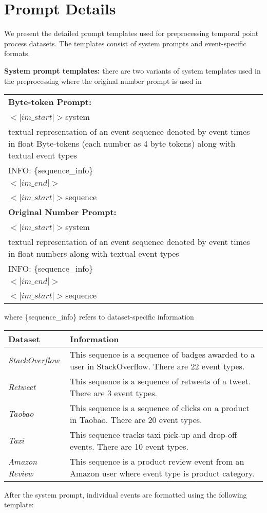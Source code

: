 

\section{Prompt Details}\label{sec:prompt}

We present the detailed prompt templates used for preprocessing temporal point process datasets. The templates consist of system prompts and event-specific formats.

\textbf{System prompt templates:} there are two variants of system templates used in the preprocessing where the original number prompt is used in~

\begin{table}[h]
\small
\begin{tabular}{|p{}|}
\hline
\textbf{Byte-token Prompt:} \\
$<|im\_start|>$system\\
textual representation of an event sequence denoted by event times in float Byte-tokens (each number as 4 byte tokens) along with textual event types\\
INFO: \{sequence\_info\}\\
$<|im\_end|>$\\
$<|im\_start|>$sequence \\
\hline
\textbf{Original Number Prompt:} \\
$<|im\_start|>$system\\
textual representation of an event sequence denoted by event times in float numbers along with textual event types\\
INFO: \{sequence\_info\}\\
$<|im\_end|>$\\
$<|im\_start|>$sequence \\
\hline
\end{tabular}
\end{table}
where \{sequence\_info\} refers to dataset-specific information

\begin{table}[h]
\small
\begin{tabular}{|l|p{}|}
\hline
\textbf{Dataset} & \textbf{Information} \\
\hline
\textit{StackOverflow} & This sequence is a sequence of badges awarded to a user in StackOverflow. There are 22 event types. \\
\hline
\textit{Retweet} & This sequence is a sequence of retweets of a tweet. There are 3 event types. \\
\hline
\textit{Taobao} & This sequence is a sequence of clicks on a product in Taobao. There are 20 event types. \\
\hline
\textit{Taxi} & This sequence tracks taxi pick-up and drop-off events. There are 10 event types. \\
\hline
\textit{Amazon Review} & This sequence is a product review event from an Amazon user where event type is product category. \\
\hline
\end{tabular}
\label{tab:dataset_info}
\end{table}
After the system prompt,
individual events are formatted using the following template:


